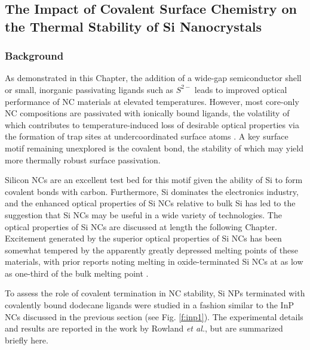 \subsection{The Impact of Covalent Surface Chemistry on the Thermal Stability of Si Nanocrystals}

\subsubsection{Background}
As demonstrated in this Chapter, the addition of a wide-gap semiconductor shell or small, inorganic passivating ligands such as $S^{2-}$ leads to improved optical performance of NC materials at elevated temperatures. However, most core-only NC compositions are passivated with ionically bound ligands, the volatility of which contributes to temperature-induced loss of desirable optical properties via the formation of trap sites at undercoordinated surface atoms \cite{rowland2013exciton, rowland2013thermal}. A key surface motif remaining unexplored is the covalent bond, the stability of which may yield more thermally robust surface passivation. \par

Silicon NCs are an excellent test bed for this motif given the ability of Si to form covalent bonds with carbon. Furthermore, Si dominates the electronics industry, and the enhanced optical properties of Si NCs relative to bulk Si has led to the suggestion that Si NCs may be useful in a wide variety of technologies. The optical properties of Si NCs are discussed at length the following Chapter. Excitement generated by the superior optical properties of Si NCs has been somewhat tempered by the apparently greatly depressed melting points of these materials, with prior reports noting melting in oxide-terminated Si NCs at as low as one-third of the bulk melting point \cite{goldstein1996melting, hirasawa2006size, lu2009size, wautelet1991estimation}. \par

To assess the role of covalent termination in NC stability, Si NPs terminated with covalently bound dodecane ligands were studied in a fashion similar to the InP NCs discussed in the previous section (see Fig. \ref{f:inp1}). The experimental details and results are reported in the work by Rowland \emph{et al.}\cite{rowland2014silicon}, but are summarized briefly here. \par

